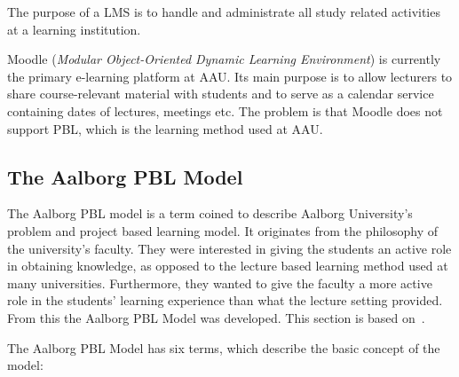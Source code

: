 The purpose of a LMS is to handle and administrate all study related activities at a learning institution.%

Moodle (\emph{Modular Object-Oriented Dynamic Learning Environment}) \citep{moodle} is currently the primary e-learning platform at AAU. 
Its main purpose is to allow lecturers to share course-relevant material with students and to serve as a calendar service containing dates of lectures, meetings etc. 
The problem is that Moodle does not support PBL, which is the learning method used at AAU.

\subsection{The Aalborg PBL Model}
\label{sub:aaupbl}
The Aalborg PBL model is a term coined to describe Aalborg University's problem and project based learning model. 
It originates from the philosophy of the university's faculty. 
They were interested in giving the students an active role in obtaining knowledge, as opposed to the lecture based learning method used at many universities.
Furthermore, they wanted to give the faculty a more active role in the students' learning experience than what the lecture setting provided. 
From this the Aalborg PBL Model was developed. 
This section is based on~\citep{Barge10}.

The Aalborg PBL Model has six terms, which describe the basic concept of the model:


